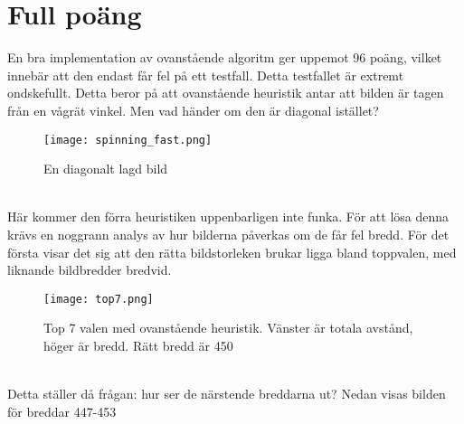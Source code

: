 \documentclass{article}
\begin{document}
\section*{Full poäng}
En bra implementation av ovanstående algoritm ger uppemot 96 poäng, vilket innebär att den endast får fel på ett testfall. Detta testfallet är extremt ondskefullt. Detta beror på att ovanstående heuristik antar att bilden är tagen från en vågrät vinkel. Men vad händer om den är diagonal istället?
\begin{figure}[h!]
    \centering
    \texttt{[image: spinning\_fast.png]}\\
\caption{En diagonalt lagd bild}
\end{figure}
\\
Här kommer den förra heuristiken uppenbarligen inte funka. För att lösa denna 
krävs en noggrann analys av hur bilderna påverkas om de får fel bredd. För det första visar det sig att den rätta bildstorleken brukar ligga bland toppvalen, med liknande bildbredder bredvid.

\clearpage
\begin{figure}[h!]
    \centering
    \texttt{[image: top7.png]}\\
\caption{Top 7 valen med ovanstående heuristik. Vänster är totala avstånd, höger är bredd. Rätt bredd är 450}
\end{figure}
\\

Detta ställer då frågan: hur ser de närstende breddarna ut? Nedan visas bilden för breddar 447-453
\end{document}
